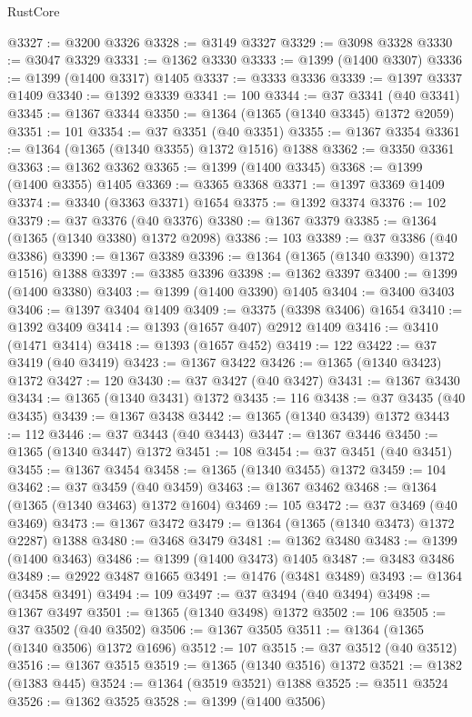 \begin{lexlean}{RustCore}
\begin{coremodule}
@3327 := @3200 @3326
@3328 := @3149 @3327
@3329 := @3098 @3328
@3330 := @3047 @3329
@3331 := @1362 @3330
@3333 := @1399 (@1400 @3307)
@3336 := @1399 (@1400 @3317) @1405
@3337 := @3333 @3336
@3339 := @1397 @3337 @1409
@3340 := @1392 @3339
@3341 := 100
@3344 := @37 @3341 (@40 @3341)
@3345 := @1367 @3344
@3350 := @1364 (@1365 (@1340 @3345) @1372 @2059)
@3351 := 101
@3354 := @37 @3351 (@40 @3351)
@3355 := @1367 @3354
@3361 := @1364 (@1365 (@1340 @3355) @1372 @1516) @1388
@3362 := @3350 @3361
@3363 := @1362 @3362
@3365 := @1399 (@1400 @3345)
@3368 := @1399 (@1400 @3355) @1405
@3369 := @3365 @3368
@3371 := @1397 @3369 @1409
@3374 := @3340 (@3363 @3371) @1654
@3375 := @1392 @3374
@3376 := 102
@3379 := @37 @3376 (@40 @3376)
@3380 := @1367 @3379
@3385 := @1364 (@1365 (@1340 @3380) @1372 @2098)
@3386 := 103
@3389 := @37 @3386 (@40 @3386)
@3390 := @1367 @3389
@3396 := @1364 (@1365 (@1340 @3390) @1372 @1516) @1388
@3397 := @3385 @3396
@3398 := @1362 @3397
@3400 := @1399 (@1400 @3380)
@3403 := @1399 (@1400 @3390) @1405
@3404 := @3400 @3403
@3406 := @1397 @3404 @1409
@3409 := @3375 (@3398 @3406) @1654
@3410 := @1392 @3409
@3414 := @1393 (@1657 @407) @2912 @1409
@3416 := @3410 (@1471 @3414)
@3418 := @1393 (@1657 @452)
@3419 := 122
@3422 := @37 @3419 (@40 @3419)
@3423 := @1367 @3422
@3426 := @1365 (@1340 @3423) @1372
@3427 := 120
@3430 := @37 @3427 (@40 @3427)
@3431 := @1367 @3430
@3434 := @1365 (@1340 @3431) @1372
@3435 := 116
@3438 := @37 @3435 (@40 @3435)
@3439 := @1367 @3438
@3442 := @1365 (@1340 @3439) @1372
@3443 := 112
@3446 := @37 @3443 (@40 @3443)
@3447 := @1367 @3446
@3450 := @1365 (@1340 @3447) @1372
@3451 := 108
@3454 := @37 @3451 (@40 @3451)
@3455 := @1367 @3454
@3458 := @1365 (@1340 @3455) @1372
@3459 := 104
@3462 := @37 @3459 (@40 @3459)
@3463 := @1367 @3462
@3468 := @1364 (@1365 (@1340 @3463) @1372 @1604)
@3469 := 105
@3472 := @37 @3469 (@40 @3469)
@3473 := @1367 @3472
@3479 := @1364 (@1365 (@1340 @3473) @1372 @2287) @1388
@3480 := @3468 @3479
@3481 := @1362 @3480
@3483 := @1399 (@1400 @3463)
@3486 := @1399 (@1400 @3473) @1405
@3487 := @3483 @3486
@3489 := @2922 @3487 @1665
@3491 := @1476 (@3481 @3489)
@3493 := @1364 (@3458 @3491)
@3494 := 109
@3497 := @37 @3494 (@40 @3494)
@3498 := @1367 @3497
@3501 := @1365 (@1340 @3498) @1372
@3502 := 106
@3505 := @37 @3502 (@40 @3502)
@3506 := @1367 @3505
@3511 := @1364 (@1365 (@1340 @3506) @1372 @1696)
@3512 := 107
@3515 := @37 @3512 (@40 @3512)
@3516 := @1367 @3515
@3519 := @1365 (@1340 @3516) @1372
@3521 := @1382 (@1383 @445)
@3524 := @1364 (@3519 @3521) @1388
@3525 := @3511 @3524
@3526 := @1362 @3525
@3528 := @1399 (@1400 @3506)

\end{coremodule}
\end{lexlean}
